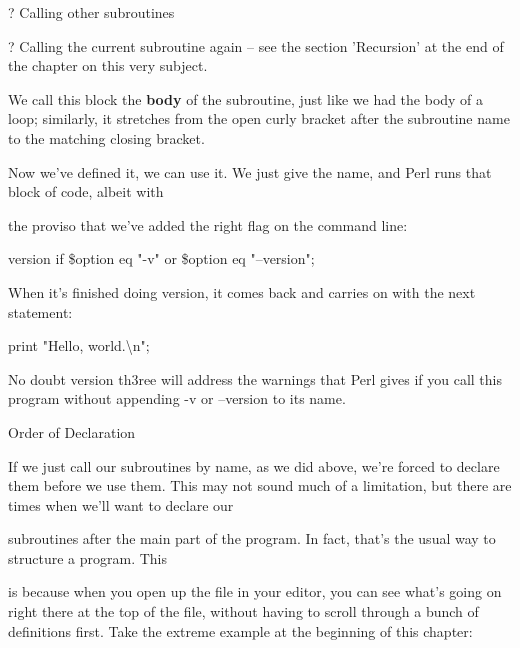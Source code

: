 \documentclass[a4paper,11pt]{book}
\begin{document}
\noindent 

\noindent ? Calling other subroutines

\noindent 

\noindent ? Calling the current subroutine again -- see the section 'Recursion' at the end of the chapter on this very subject.

\noindent 

\noindent We call this block the \textbf{body }of the subroutine, just like we had the body of a loop; similarly, it stretches from the open curly bracket after the subroutine name to the matching closing bracket.

\noindent 

\noindent 

\noindent Now we've defined it, we can use it. We just give the name, and Perl runs that block of code, albeit with

\noindent the proviso that we've added the right flag on the command line:

\noindent 

\noindent version if \$option eq "-v" or \$option eq "--version";

\noindent 

\noindent When it's finished doing version, it comes back and carries on with the next statement:

\noindent 

\noindent print "Hello, world.\textbackslash n";

\noindent 

\noindent No doubt version th3ree will address the warnings that Perl gives if you call this program without appending -v or --version to its name.

\noindent 

\noindent Order of Declaration

\noindent 

\noindent If we just call our subroutines by name, as we did above, we're forced to declare them before we use them. This may not sound much of a limitation, but there are times when we'll want to declare our

\noindent subroutines after the main part of the program. In fact, that's the usual way to structure a program. This

\noindent is because when you open up the file in your editor, you can see what's going on right there at the top of the file, without having to scroll through a bunch of definitions first. Take the extreme example at the beginning of this chapter:
\end{document}

